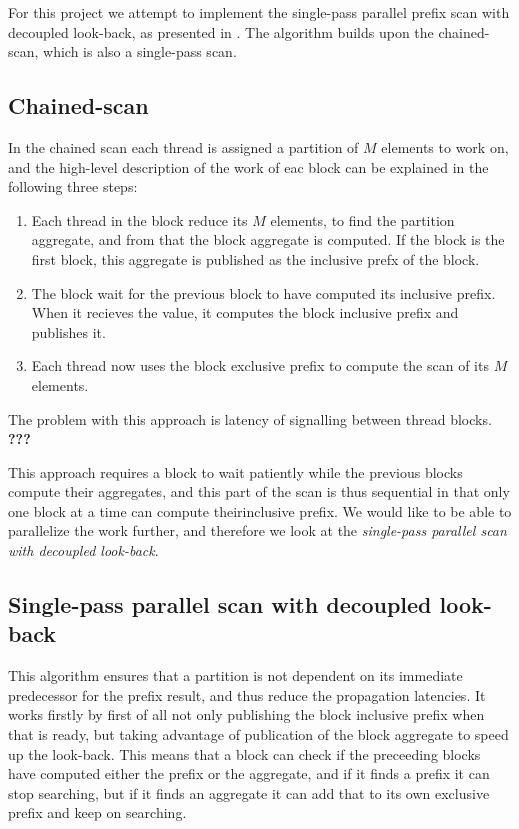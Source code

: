 For this project we attempt to implement the single-pass parallel prefix scan with decoupled look-back, as presented in \cite{spsArticle}.
The algorithm builds upon the chained-scan, which is also a single-pass scan.

\subsection{Chained-scan}
In the chained scan each thread is assigned a partition of $M$ elements to work on,
and the high-level description of the work of eac block can be explained in the following three steps:
\begin{enumerate}
  \item Each thread in the block reduce its $M$ elements, to find the partition aggregate, and from that the block aggregate is computed.
        If the block is the first block, this aggregate is published as the inclusive prefx of the block.
  \item The block wait for the previous block to have computed its inclusive prefix.
        When it recieves the value, it computes the block inclusive prefix and publishes it.
  \item Each thread now uses the block exclusive prefix to compute the scan of its $M$ elements.
\end{enumerate}
The problem with this approach is latency of signalling between thread blocks. \textbf{???}

This approach requires a block to wait patiently while the previous blocks compute their aggregates, and this part of the scan is thus sequential in that only one block at a time can compute theirinclusive prefix.
We would like to be able to parallelize the work further, and therefore we look at the \textit{single-pass parallel scan with decoupled look-back}.

\subsection{Single-pass parallel scan with decoupled look-back}
This algorithm ensures that a partition is not dependent on its immediate predecessor for the prefix result, and thus reduce the propagation latencies.
It works firstly by first of all not only publishing the block inclusive prefix when that is ready, but taking advantage of publication of the block aggregate to speed up the look-back.
This means that a block can check if the preceeding blocks have computed either the prefix or the aggregate, and if it finds a prefix it can stop searching, but if it finds an aggregate it can add that to its own exclusive prefix and keep on searching.

